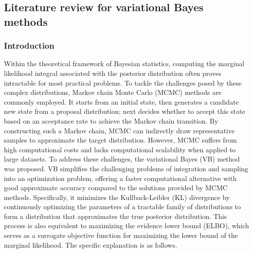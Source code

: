 \documentclass[12pt,a4paper]{article}
\begin{document}
\subsection{Literature review for variational Bayes methods}
\subsubsection{Introduction}
Within the theoretical framework of Bayesian statistics, computing the marginal likelihood integral associated with the posterior distribution often proves intractable for most practical problems. To tackle the challenges posed by these complex distributions, Markov chain Monte Carlo (MCMC) methods are commonly employed. It starts from an initial state, then generates a candidate new state from a proposal distribution; next decides whether to accept this state based on an acceptance rate to achieve the Markov chain transition. By constructing such a Markov chain, MCMC can indirectly draw representative samples to approximate the target distribution. However, MCMC suffers from high computational costs and lacks computational scalability when applied to large datasets. To address these challenges, the variational Bayes (VB) method was proposed. VB simplifies the challenging problems of integration and sampling into an optimization problem, offering a faster computational alternative with good approximate accuracy compared to the solutions provided by MCMC methods. Specifically, it minimizes the Kullback-Leibler (KL) divergence by continuously optimizing the parameters of a tractable family of distributions to form a distribution that approximates the true posterior distribution. This process is also equivalent to maximizing the evidence lower bound (ELBO), which serves as a surrogate objective function for maximizing the lower bound of the marginal likelihood. The specific explanation is as follows.
\end{document}
